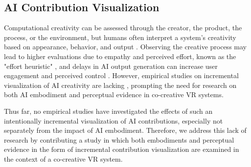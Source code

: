 


\subsection{AI Contribution Visualization}
Computational creativity can be assessed through the creator, the product, the process, or the environment, but humans often interpret a system's creativity based on appearance, behavior, and output \cite{rhodes_analysis_1961, lee_what_2020, parise_cooperating_1999, el-zanfaly_sand_2023, pearce_towards_2001}. Observing the creative process may lead to higher evaluations due to empathy and perceived effort, known as the "effort heuristic" \cite{colton_painting_2012, kruger_effort_2004}, and delays in AI output generation can increase user engagement and perceived control \cite{liu_how_2023}. However, empirical studies on incremental visualization of AI creativity are lacking \cite{linkola_how_2022}, prompting the need for research on both AI embodiment and perceptual evidence in co-creative VR systems.

Thus far, no empirical studies have investigated the effects of such an intentionally incremental visualization of AI contributions, especially not separately from the impact of AI embodiment. Therefore, we address this lack of research by contributing a study in which both embodiments and perceptual evidence in the form of incremental contribution visualization are examined in the context of a co-creative VR system.
